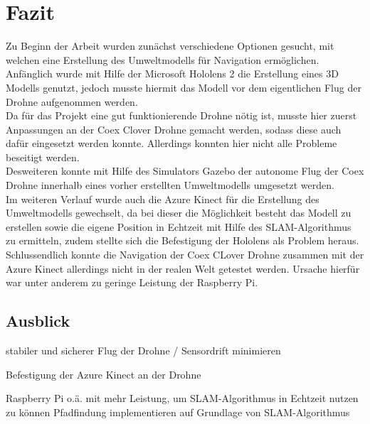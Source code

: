 \chapter{Fazit}
Zu Beginn der Arbeit wurden zunächst verschiedene Optionen gesucht, mit welchen eine Erstellung des Umweltmodells für Navigation ermöglichen. Anfänglich wurde mit Hilfe der Microsoft Hololens 2 die Erstellung eines 3D Modells genutzt, jedoch musste hiermit das Modell vor dem eigentlichen Flug der Drohne aufgenommen werden. \\
Da für das Projekt eine gut funktionierende Drohne nötig ist, musste hier zuerst Anpassungen an der Coex Clover Drohne gemacht werden, sodass diese auch dafür eingesetzt werden konnte. Allerdings konnten hier nicht alle Probleme beseitigt werden.\\ 
Desweiteren konnte mit Hilfe des Simulators Gazebo der autonome Flug der Coex Drohne innerhalb eines vorher erstellten Umweltmodells umgesetzt werden. \\
Im weiteren Verlauf wurde auch die Azure Kinect für die Erstellung des Umweltmodells gewechselt, da bei dieser die Möglichkeit besteht das Modell zu erstellen sowie die eigene Position in Echtzeit mit Hilfe des SLAM-Algorithmus zu ermitteln, zudem stellte sich die Befestigung der Hololens als Problem heraus. \\ 
Schlussendlich konnte die Navigation der Coex CLover Drohne zusammen mit der Azure Kinect allerdings nicht in der realen Welt getestet werden. Ursache hierfür war unter anderem zu geringe Leistung der Raspberry Pi.




\section{Ausblick}
stabiler und sicherer Flug der Drohne / Sensordrift minimieren

Befestigung der Azure Kinect an der Drohne

Raspberry Pi o.ä. mit mehr Leistung, um SLAM-Algorithmus in Echtzeit nutzen zu können
Pfadfindung implementieren auf Grundlage von SLAM-Algorithmus 
